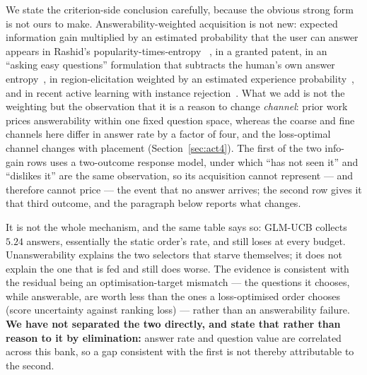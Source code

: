 \documentclass[11pt]{article}
\begin{document}
We state the criterion-side conclusion carefully, because the obvious strong form is not ours to
make. Answerability-weighted acquisition is not new: expected information gain multiplied by an
estimated probability that the user can answer appears in Rashid's popularity-times-entropy
~\cite{rashid2002getting}, in a granted patent, in an ``asking easy questions'' formulation that
subtracts the human's own answer entropy~\cite{biyik2023soft}, in region-elicitation weighted by an
estimated experience probability~\cite{nguyen2024pere}, and in recent active learning with instance
rejection~\cite{gao2024selbald}. What we add is not the
weighting but the observation that it is a reason to change \emph{channel}: prior work prices
answerability within one fixed question space, whereas the coarse and fine channels here differ in
answer rate by a factor of four, and the loss-optimal channel changes with placement
(Section~\ref{sec:act4}). The first of the two info-gain rows uses a two-outcome response model,
under which ``has not seen it'' and ``dislikes it'' are the same observation, so its acquisition
cannot represent --- and therefore cannot price --- the event that no answer arrives; the second row
gives it that third outcome, and the paragraph below reports what changes.

It is not the whole mechanism, and the same table says so: GLM-UCB collects $5.24$ answers,
essentially the static order's rate, and still loses at every budget. Unanswerability explains the
two selectors that starve themselves; it does not explain the one that is fed and still does worse.
The evidence is consistent with the residual being an optimisation-target mismatch --- the questions
it chooses, while answerable, are worth less than the ones a loss-optimised order chooses (score
uncertainty against ranking loss) --- rather than an answerability failure. \textbf{We have not
separated the two directly, and state that rather than reason to it by elimination:} answer rate and
question value are correlated across this bank, so a gap consistent with the first is not thereby
attributable to the second. 
\end{document}
